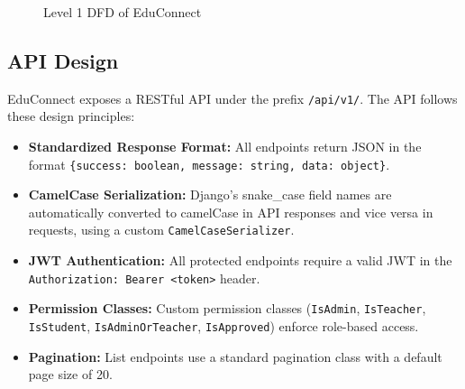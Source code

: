 \begin{figure}[H]
\centering
{}
\caption{Level 1 DFD of EduConnect}
\label{fig:dfd_level1}
\end{figure}

\subsection{API Design}

EduConnect exposes a RESTful API under the prefix \texttt{/api/v1/}. The API follows these design principles:

\begin{itemize}[leftmargin=2em]
    \item \textbf{Standardized Response Format:} All endpoints return JSON in the format \texttt{\{success: boolean, message: string, data: object\}}.
    \item \textbf{CamelCase Serialization:} Django's snake\_case field names are automatically converted to camelCase in API responses and vice versa in requests, using a custom \texttt{CamelCaseSerializer}.
    \item \textbf{JWT Authentication:} All protected endpoints require a valid JWT in the \texttt{Authorization: Bearer <token>} header.
    \item \textbf{Permission Classes:} Custom permission classes (\texttt{IsAdmin}, \texttt{IsTeacher}, \texttt{IsStudent}, \texttt{IsAdminOrTeacher}, \texttt{IsApproved}) enforce role-based access.
    \item \textbf{Pagination:} List endpoints use a standard pagination class with a default page size of 20.
\end{itemize}

